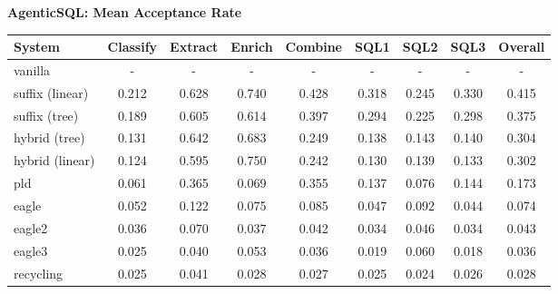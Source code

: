 \textbf{AgenticSQL: Mean Acceptance Rate}
\begin{table}[H]
\begin{adjustbox}{width=\linewidth}
\centering
\begin{tabular}{lcccccccc}
\toprule
\textbf{System} & Classify & Extract & Enrich & Combine & SQL1 & SQL2 & SQL3 & \textbf{Overall} \\
\midrule
vanilla & - & - & - & - & - & - & - & - \\
suffix (linear) & 0.212 & 0.628 & 0.740 & 0.428 & 0.318 & 0.245 & 0.330 & 0.415 \\
suffix (tree) & 0.189 & 0.605 & 0.614 & 0.397 & 0.294 & 0.225 & 0.298 & 0.375 \\
hybrid (tree) & 0.131 & 0.642 & 0.683 & 0.249 & 0.138 & 0.143 & 0.140 & 0.304 \\
hybrid (linear) & 0.124 & 0.595 & 0.750 & 0.242 & 0.130 & 0.139 & 0.133 & 0.302 \\
pld & 0.061 & 0.365 & 0.069 & 0.355 & 0.137 & 0.076 & 0.144 & 0.173 \\
eagle & 0.052 & 0.122 & 0.075 & 0.085 & 0.047 & 0.092 & 0.044 & 0.074 \\
eagle2 & 0.036 & 0.070 & 0.037 & 0.042 & 0.034 & 0.046 & 0.034 & 0.043 \\
eagle3 & 0.025 & 0.040 & 0.053 & 0.036 & 0.019 & 0.060 & 0.018 & 0.036 \\
recycling & 0.025 & 0.041 & 0.028 & 0.027 & 0.025 & 0.024 & 0.026 & 0.028 \\
\bottomrule
\end{tabular}
\end{adjustbox}
\end{table}

